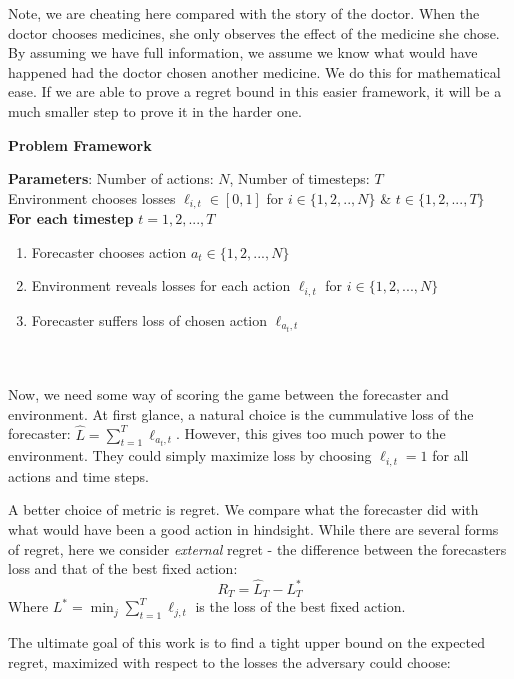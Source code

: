 \documentclass[10pt,a4paper]{article} %
\begin{document}
	Note, we are cheating here compared with the story of the doctor.  When the doctor chooses medicines, she only observes the effect of the medicine she chose.  By assuming we have full information, we assume we know what would have happened had the doctor chosen another medicine.  We do this for mathematical ease.  If we are able to prove a regret bound in this easier framework, it will be a much smaller step to prove it in the harder one.  \\
	
	\noindent \begin{minipage}{\textwidth}
	\centerline{\textbf{Problem Framework}} 
	\noindent\begin{boxedminipage}{\textwidth}
		\textbf{Parameters}: Number of actions: $N$, Number of timesteps: $T$ \\
		Environment chooses losses $\ell_{i, t} \in [0, 1]$ for $i \in \{1, 2, .., N\}$ \& $t \in \{1, 2, ..., T\} $ \\
		\textbf{For each timestep} $t = 1, 2, ..., T$
		\begin{enumerate}
			\item Forecaster chooses action $a_{t} \in \{1, 2, ..., N\}$
			\item Environment reveals losses for each action $\ell_{i, t}$ for $i \in \{1, 2, ..., N\}$
			\item Forecaster suffers loss of chosen action $\ell_{a_t, t}$
		\end{enumerate}
	\end{boxedminipage}
\end{minipage}
	\\ $\,$ \\
	Now, we need some way of scoring the game between the forecaster and environment.  At first glance, a natural choice is the cummulative loss of the forecaster: $\widehat{L} = \sum_{t = 1}^{T} \ell_{a_t, t}$.  However, this gives too much power to the environment.  They could simply maximize loss by choosing $\ell_{i, t} = 1$ for all actions and time steps.
	
	A better choice of metric is regret. We compare what the forecaster did with what would have been a good action in hindsight.  While there are several forms of regret, here we consider \textit{external} regret - the difference between the forecasters loss and that of the best fixed action:
	$$R_T = \widehat{L}_T - L^*_T$$
	Where $L^* = \min_j \sum_{t = 1}^{T} \ell_{j, t}$ is the loss of the best fixed action.  
	
	The ultimate goal of this work is to find a tight upper bound on the expected regret, maximized with respect to the losses the adversary could choose:
	
\end{document}
